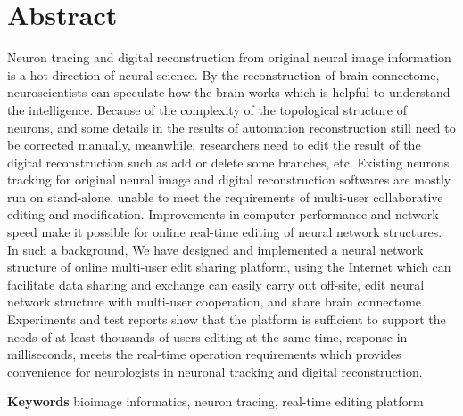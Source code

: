 \chapter{Abstract}

Neuron tracing and digital reconstruction from original neural image information is a hot direction of neural science. By the reconstruction of brain connectome, neuroscientists can speculate how the brain works which is helpful to understand the intelligence. Because of the complexity of the topological structure of neurons, and some details in the results of automation reconstruction still need to be corrected manually, meanwhile, researchers need to edit the result of the digital reconstruction such as add or delete some branches, etc. Existing neurons tracking for original neural image and digital reconstruction softwares are mostly run on stand-alone, unable to meet the requirements of multi-user collaborative editing and modification. Improvements in computer performance and network speed make it possible for online real-time editing of neural network structures. In such a background, We have designed and implemented a neural network structure of online multi-user edit sharing platform, using the Internet which can facilitate data sharing and exchange can easily carry out off-site, edit neural network structure with multi-user cooperation, and share brain connectome. Experiments and test reports show that the platform is sufficient to support the needs of at least thousands of users editing at the same time, response in milliseconds, meets the real-time operation requirements which provides convenience for neurologists in neuronal tracking and digital reconstruction.

{
    \vspace{1em}
    \setlength{\parindent}{0em}
    \textbf{Keywords} \; bioimage informatics, \;  neuron tracing, \; real-time editing platform \par
}
